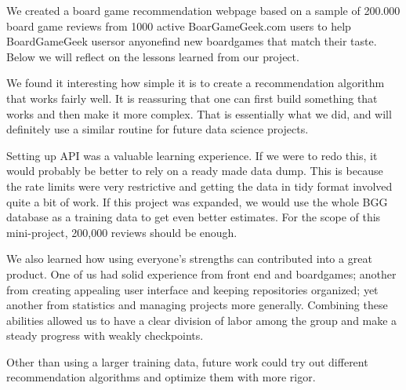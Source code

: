 \documentclass[a4paper,12pt,bibliography=totoc,numbers=noenddot,sfdefaults=false,abstract=true,notitlepage]{scrartcl} %
\begin{document}
	We created a board game recommendation webpage based on a sample of 200.000 board game reviews from 1000 active BoarGameGeek.com users to help BoardGameGeek users\textemdash or anyone\textemdash find new boardgames that match their taste. Below we will reflect on the lessons learned from our project.
	
	We found it interesting how simple it is to create a recommendation algorithm that works fairly well. It is reassuring that one can first build something that works and then make it more complex. That is essentially what we did, and will definitely use a similar routine for future data science projects.
	
	
	Setting up API was a valuable learning experience. If we were to redo this, it would probably be better to rely on a ready made data dump. This is because the rate limits were very restrictive and getting the data in tidy format involved quite a bit of work. If this project was expanded, we would use the whole BGG database as a training data to get even better estimates. For the scope of this mini-project, 200,000 reviews should be enough.


	
	We also learned how using everyone's strengths can contributed into a great product. One of us had solid experience from front end and boardgames; another from creating appealing user interface and keeping repositories organized; yet another from statistics and managing projects more generally. Combining these abilities allowed us to have a clear division of labor among the group and make a steady progress with weakly checkpoints.
	
	
	Other than using a larger training data, future work could try out different recommendation algorithms and optimize them with more rigor.
	
\end{document}
